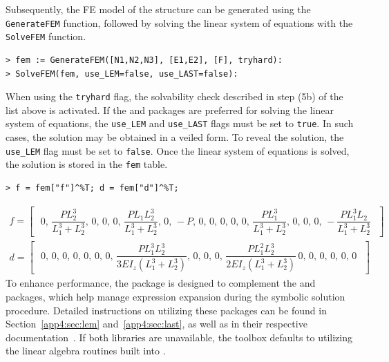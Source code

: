 Subsequently, the \ac{FE} model of the structure can be generated using the \texttt{GenerateFEM} function, followed by solving the linear system of equations with the \texttt{SolveFEM} function.
%
\begin{verbatim}
> fem := GenerateFEM([N1,N2,N3], [E1,E2], [F], tryhard):
> SolveFEM(fem, use_LEM=false, use_LAST=false):
\end{verbatim}
%
When using the \texttt{tryhard} flag, the solvability check described in step (5b) of the list above is activated. If the \LEM{} and \LAST{} packages are preferred for solving the linear system of equations, the \texttt{use\_LEM} and \texttt{use\_LAST} flags must be set to \texttt{true}. In such cases, the solution may be obtained in a veiled form. To reveal the solution, the \texttt{use\_LEM} flag must be set to \texttt{false}. Once the linear system of equations is solved, the solution is stored in the \texttt{fem} table.
%
\begin{verbatim}
> f = fem["f"]^%T; d = fem["d"]^%T;
\end{verbatim}
\begin{equation*}
  \begin{matrix}
    f = \left[\,\begin{matrix}
      \, 0, \, \dfrac{PL_2^3}{L_1^3+L_2^3}, \, 0, \, 0, \, 0, \, \dfrac{PL_1L_2^3}{L_1^3+L_2^3}, \, 0, \, -P, \, 0, \, 0, \, 0, \, 0, \, 0, \, \dfrac{PL_1^3}{L_1^3+L_2^3}, \, 0, \, 0, \, 0, \, -\dfrac{PL_1^3L_2}{L_1^3+L_2^3} \,
    \end{matrix}\,\right] \\[1.5em]
    d = \left[\,\begin{matrix}
      \, 0, \, 0, \, 0, \, 0, \, 0, \, 0, \, 0, \, \dfrac{PL_1^3L_2^3}{3EI_z(L_1^3+L_2^3)}, \, 0, \, 0, \, 0, \, \dfrac{PL_1^2L_2^3}{2EI_z(L_1^3+L_2^3)} \, 0, \, 0, \, 0, \, 0, \, 0, \, 0 \,
    \end{matrix}\,\right]
  \end{matrix}
\end{equation*}
%
To enhance performance, the \TrussMe{} package is designed to complement the \LEM{} and \LAST{} packages, which help manage expression expansion during the symbolic solution procedure. Detailed instructions on utilizing these packages can be found in Section~\ref{app4:sec:lem} and~\ref{app4:sec:last}, as well as in their respective documentation~\cite{lem, last}. If both libraries are unavailable, the toolbox defaults to utilizing the linear algebra routines built into \Maple{}.

